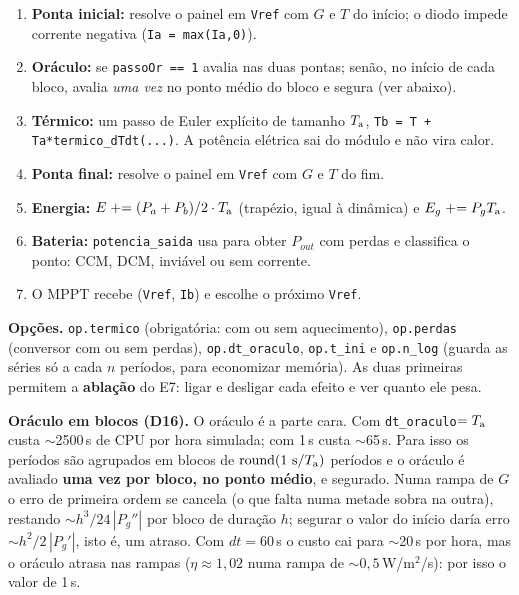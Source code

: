\begin{logica}
\begin{enumerate}
\item \textbf{Ponta inicial:} resolve o painel em \texttt{Vref} com $G$ e $T$ do in\'icio; o diodo impede corrente negativa (\texttt{Ia = max(Ia,0)}).
\item \textbf{Or\'aculo:} se \texttt{passoOr == 1} avalia nas duas pontas; sen\~ao, no in\'icio de cada bloco, avalia \emph{uma vez} no ponto m\'edio do bloco e segura (ver abaixo).
\item \textbf{T\'ermico:} um passo de Euler expl\'icito de tamanho $T_{\mathrm{a}}$, \texttt{Tb = T + Ta*termico\_dTdt(...)}. A pot\^encia el\'etrica sai do m\'odulo e n\~ao vira calor.
\item \textbf{Ponta final:} resolve o painel em \texttt{Vref} com $G$ e $T$ do fim.
\item \textbf{Energia:} $E\mathrel{+}=(P_a+P_b)/2\cdot T_{\mathrm{a}}$ (trap\'ezio, igual \`a din\^amica) e $E_g\mathrel{+}=P_gT_{\mathrm{a}}$.
\item \textbf{Bateria:} \texttt{potencia\_saida} usa  para obter $P_{out}$ com perdas e classifica o ponto: CCM, DCM, invi\'avel ou sem corrente.
\item O MPPT recebe (\texttt{Vref}, \texttt{Ib}) e escolhe o pr\'oximo \texttt{Vref}.
\end{enumerate}
\end{logica}

\textbf{Op\c{c}\~oes.} \texttt{op.termico} (obrigat\'oria: com ou sem aquecimento), \texttt{op.perdas} (conversor com ou sem perdas), \texttt{op.dt\_oraculo}, \texttt{op.t\_ini} e \texttt{op.n\_log} (guarda as s\'eries s\'o a cada
$n$ per\'iodos, para economizar mem\'oria). As duas primeiras permitem a \textbf{abla\c{c}\~ao} do E7: ligar e desligar cada efeito e ver quanto ele pesa.

\textbf{Or\'aculo em blocos (D16).} O or\'aculo \'e a parte cara. Com \texttt{dt\_oraculo}$=T_{\mathrm{a}}$ custa $\sim$2500\,s de CPU por hora simulada; com 1\,s custa $\sim$65\,s. Para isso os per\'iodos s\~ao
agrupados em blocos de $\mathrm{round}(1\text{ s}/T_{\mathrm{a}})$ per\'iodos e o or\'aculo \'e avaliado \textbf{uma vez por bloco, no ponto m\'edio}, e segurado. Numa rampa de $G$ o erro de primeira ordem se
cancela (o que falta numa metade sobra na outra), restando $\sim h^3/24\,|P_g''|$ por bloco de dura\c{c}\~ao $h$; segurar o valor do in\'icio dar\'ia erro $\sim h^2/2\,|P_g'|$, isto \'e, um atraso.
Com $dt=60$\,s o custo cai para $\sim$20\,s por hora, mas o or\'aculo atrasa nas rampas ($\eta\approx1{,}02$ numa rampa de $\sim0{,}5$\,W/m$^2$/s): por isso o valor de 1\,s.

